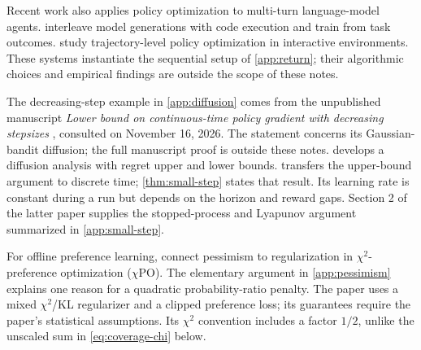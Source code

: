 \documentclass[11pt,twoside]{article}
\theoremstyle{definition}
\theoremstyle{remark}
\begin{document}
Recent work also applies policy optimization to multi-turn language-model
agents. \citet{feng2025retool} interleave model generations with code
execution and train from task outcomes. \citet{wang2025ragen} study
trajectory-level policy optimization in interactive environments. These
systems instantiate the sequential setup of \cref{app:return}; their
algorithmic choices and empirical findings are outside the scope of these
notes.

The decreasing-step example in \cref{app:diffusion} comes from the
unpublished manuscript \emph{Lower bound on continuous-time policy gradient
with decreasing stepsizes} \citep{decreasingdraft}, consulted on
November 16, 2026. The statement concerns its Gaussian-bandit diffusion;
the full manuscript proof is outside these notes.
\citet{lattimore2026diffusion} develops a diffusion analysis with regret
upper and lower bounds. \citet[Theorem 1]{lattimore2026lyapunov} transfers
the upper-bound argument to discrete time; \cref{thm:small-step} states
that result. Its learning rate is constant during a run but depends on
the horizon and reward gaps. Section 2 of the latter paper supplies the
stopped-process and Lyapunov argument summarized in \cref{app:small-step}.

For offline preference learning, \citet{huang2024} connect pessimism to
regularization in $\chi^2$-preference optimization ($\chi$PO).
The elementary argument in \cref{app:pessimism} explains one reason for a
quadratic probability-ratio penalty. The paper uses a mixed
$\chi^2$/KL regularizer and a clipped preference loss; its guarantees
require the paper's statistical assumptions. Its $\chi^2$ convention
includes a factor $1/2$, unlike the unscaled sum in
\cref{eq:coverage-chi} below.
\end{document}

